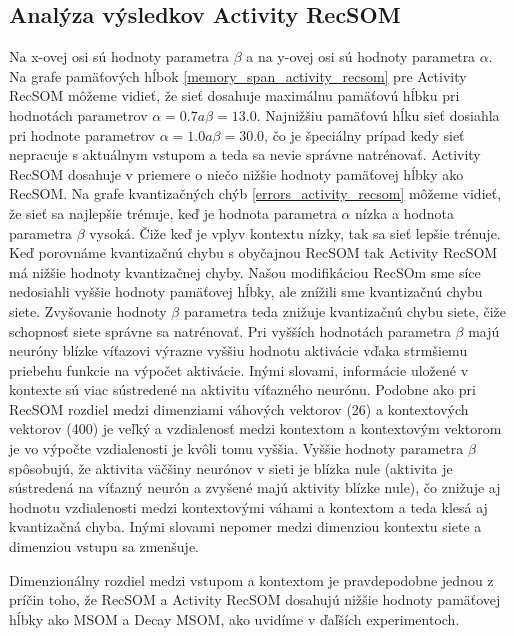 \subsection{Analýza výsledkov Activity RecSOM}
Na x-ovej osi sú hodnoty parametra $\beta$ a na y-ovej osi sú hodnoty parametra $\alpha$.
Na grafe pamäťových hĺbok \ref{memory_span_activity_recsom} pre Activity RecSOM môžeme vidieť, že sieť dosahuje 
maximálnu pamäťovú hĺbku pri hodnotách parametrov $\alpha = 0.7 a \beta = 13.0$.
Najnižšiu pamäťovú hĺku sieť dosiahla pri hodnote parametrov  $\alpha = 1.0 a \beta = 30.0$, čo je špeciálny prípad
kedy sieť nepracuje s aktuálnym vstupom a teda sa nevie správne natrénovať.
Activity RecSOM dosahuje v priemere o niečo nižšie hodnoty pamäťovej hĺbky ako RecSOM.
Na grafe kvantizačných chýb \ref{errors_activity_recsom} môžeme vidieť, že sieť sa najlepšie trénuje, keď je hodnota 
parametra $\alpha$ nízka a hodnota parametra $\beta$ vysoká. Čiže keď je vplyv kontextu nízky, tak sa sieť lepšie trénuje.
Keď porovnáme kvantizačnú chybu s obyčajnou RecSOM tak Activity RecSOM má nižšie hodnoty kvantizačnej chyby. 
Našou modifikáciou RecSOm sme síce nedosiahli vyššie hodnoty pamäťovej hĺbky, ale znížili sme kvantizačnú chybu siete.
Zvyšovanie hodnoty $\beta$ parametra teda znižuje kvantizačnú chybu siete, čiže schopnosť siete správne sa natrénovať.
Pri vyšších hodnotách parametra $\beta$ majú neuróny blízke víťazovi výrazne vyššiu hodnotu aktivácie vďaka strmšiemu priebehu funkcie na výpočet aktivácie. 
Inými slovami, informácie uložené v kontexte sú viac sústredené na aktivitu víťazného neurónu. 
Podobne ako pri RecSOM rozdiel medzi dimenziami váhových vektorov (26) a kontextových vektorov (400) je veľký a vzdialenosť medzi kontextom a kontextovým vektorom
je vo výpočte vzdialenosti je kvôli tomu vyššia. Vyššie hodnoty parametra $\beta$ spôsobujú, že aktivita väčšiny neurónov v sieti je blízka nule (aktivita je sústredená na víťazný neurón a zvyšené majú aktivity blízke nule), čo znižuje aj hodnotu
vzdialenosti medzi kontextovými váhami a kontextom a teda klesá aj kvantizačná chyba. Inými slovami nepomer medzi dimenziou kontextu siete a dimenziou vstupu sa zmenšuje.

Dimenzionálny rozdiel medzi vstupom a kontextom je pravdepodobne jednou z príčin toho, že RecSOM a Activity RecSOM dosahujú nižšie hodnoty 
pamäťovej hĺbky ako MSOM a Decay MSOM, ako uvidíme v ďaľších experimentoch.


